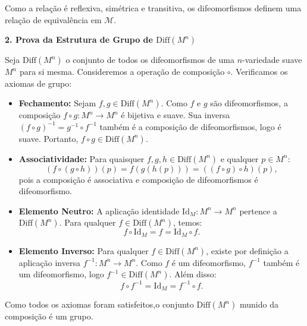 {	Como a relação é reflexiva, simétrica e transitiva, os difeomorfismos definem uma relação de equivalência em $\mathcal{M}$.
	
	\textbf{2. Prova da Estrutura de Grupo de $\text{Diff}(M^n)$}
	
	Seja $\text{Diff}(M^n)$ o conjunto de todos os difeomorfismos de uma $n$-variedade suave $M^n$ para si mesma. Consideremos a operação de composição $\circ$. Verificamos os axiomas de grupo:
	
	\begin{itemize}
		\item \textbf{Fechamento:} Sejam $f, g \in \text{Diff}(M^n)$. Como $f$ e $g$ são difeomorfismos, a composição $f \circ g: M^n \to M^n$ é bijetiva e suave. Sua inversa $(f \circ g)^{-1} = g^{-1} \circ f^{-1}$ também é a composição de difeomorfismos, logo é suave. Portanto, $f \circ g \in \text{Diff}(M^n)$.
		
		\item \textbf{Associatividade:} Para quaisquer $f, g, h \in \text{Diff}(M^n)$ e qualquer $p \in M^n$:
		\begin{equation*}
			(f \circ (g \circ h))(p) = f(g(h(p))) = ((f \circ g) \circ h)(p),
		\end{equation*}
		pois a composição é associativa e composição de difeomorfismos é difeomorfismo.
		
		\item \textbf{Elemento Neutro:} A aplicação identidade $\text{Id}_M: M^n \to M^n$ pertence a $\text{Diff}(M^n)$. Para qualquer $f \in \text{Diff}(M^n)$, temos:
		\begin{equation*}
			f \circ \text{Id}_M = f = \text{Id}_M \circ f.
		\end{equation*}
		
		\item \textbf{Elemento Inverso:} Para qualquer $f \in \text{Diff}(M^n)$, existe por definição a aplicação inversa $f^{-1}: M^n \to M^n$. Como $f$ é um difeomorfismo, $f^{-1}$ também é um difeomorfismo, logo $f^{-1} \in \text{Diff}(M^n)$. Além disso:
		\begin{equation*}
			f \circ f^{-1} = \text{Id}_M = f^{-1} \circ f.
		\end{equation*}
	\end{itemize}
	
	Como todos os axiomas foram satisfeitos,o conjunto $\text{Diff}(M^n)$ munido da composição é um grupo.
}
